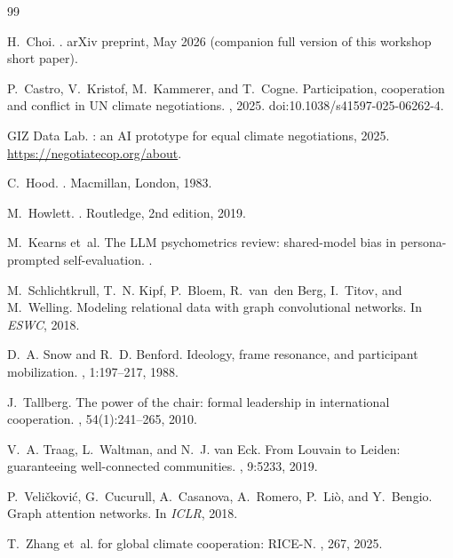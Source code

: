 \documentclass{article}
\begin{document}

\begin{thebibliography}{99}
\small

H.~Choi.
.
\newblock arXiv preprint, May 2026 (companion full version of this workshop short paper).

P.~Castro, V.~Kristof, M.~Kammerer, and T.~Cogne.
\newblock Participation, cooperation and conflict in {UN} climate negotiations.
, 2025. doi:10.1038/s41597-025-06262-4.

{GIZ Data Lab}.
: an {AI} prototype for equal climate negotiations, 2025.
\newblock \url{https://negotiatecop.org/about}.

C.~Hood.
.
\newblock Macmillan, London, 1983.

M.~Howlett.
.
\newblock Routledge, 2nd edition, 2019.

M.~Kearns et~al.
\newblock The {LLM} psychometrics review: shared-model bias in persona-prompted self-evaluation.
.

M.~Schlichtkrull, T.~N. Kipf, P.~Bloem, R.~van~den Berg, I.~Titov, and M.~Welling.
\newblock Modeling relational data with graph convolutional networks.
\newblock In {\em ESWC}, 2018.

D.~A. Snow and R.~D. Benford.
\newblock Ideology, frame resonance, and participant mobilization.
, 1:197--217, 1988.

J.~Tallberg.
\newblock The power of the chair: formal leadership in international cooperation.
, 54(1):241--265, 2010.

V.~A. Traag, L.~Waltman, and N.~J. van Eck.
\newblock From {Louvain} to {Leiden}: guaranteeing well-connected communities.
, 9:5233, 2019.

P.~Veli\v{c}kovi\'{c}, G.~Cucurull, A.~Casanova, A.~Romero, P.~Li\`{o}, and Y.~Bengio.
\newblock Graph attention networks.
\newblock In {\em ICLR}, 2018.

T.~Zhang et~al.
 for global climate cooperation: {RICE-N}.
, 267, 2025.

\end{thebibliography}
\end{document}
